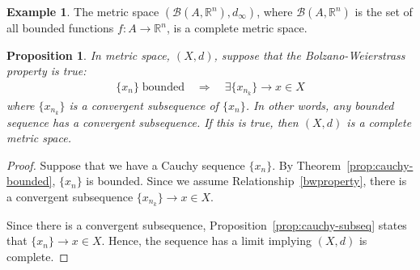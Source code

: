 \documentclass[12pt]{article}
\theoremstyle{plain}
\newtheorem{prop}[thm]{Proposition}
\theoremstyle{definition}
\newtheorem{ex}[thm]{Example}
\theoremstyle{remark}
\newcommand{\R}{\mathbb{R}}
\begin{document}
\begin{ex}
The metric space $\left(\mathscr{B}(A,\R^n), d_\infty\right)$,
where $\mathscr{B}(A,\R^n)$ is the set of all bounded functions
$f:A\rightarrow \R^n$, is a complete metric space.
\end{ex}

\begin{prop}
\label{prop:bwproperty}
In metric space, $(X,d)$,
suppose that the \emph{Bolzano-Weierstrass} property is true:
\begin{align}
  \label{bwproperty}
  \{x_n\} \;\text{bounded}
  \quad\Rightarrow\quad
  \exists \{x_{n_k}\}\rightarrow x \in X
\end{align}
where $\{x_{n_k}\}$ is a convergent subsequence of $\{x_n\}$.  In other
words, any bounded sequence has a convergent subsequence. If this is
true, then $(X,d)$ is a complete metric space.
\end{prop}
\begin{proof}
Suppose that we have a Cauchy sequence $\{x_n\}$. By
Theorem~\ref{prop:cauchy-bounded}, $\{x_n\}$ is bounded. Since we assume
Relationship~\ref{bwproperty}, there is a convergent subsequence
$\{x_{n_k}\}\rightarrow x \in X$.

Since there is a convergent subsequence,
Proposition~\ref{prop:cauchy-subseq} states that $\{x_n\}\rightarrow
x\in X$. Hence, the sequence has a limit implying $(X,d)$ is complete.
\end{proof}
\end{document}
